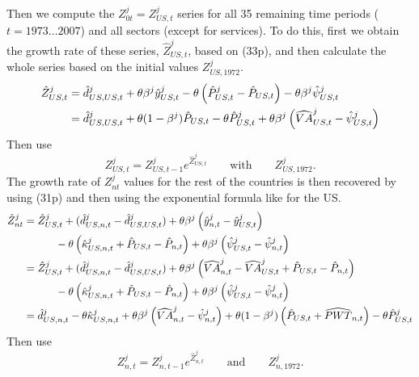 \documentclass[11pt,oneside,a4paper]{article}
\begin{document}
%
Then we compute the $Z_{0t}^j = Z_{US, t}^j$ series for all 35 remaining time periods ($t = 1973 \dots 2007$) and all sectors (except for services). To do this, first we obtain the growth rate of these series, $\hat{Z}_{US, t}^j$, based on (33p), and then calculate the whole series based on the initial values $Z_{US, 1972}^j$.
%
\begin{align}
\hat{Z}_{US, t}^{j} &= \hat{d}_{US, US, t}^{j} + \theta\beta^{j} \hat{y}_{US, t}^{j} - \theta \left(\hat{P}_{US, t}^{j} - \hat{P}_{US, t}\right) - \theta\beta^{j} \hat{\psi}_{US, t}^{j} \notag\\
%
&= \hat{d}_{US, US, t}^{j} + \theta(1 - \beta^{j}) \hat{P}_{US, t} - \theta \hat{P}_{US, t}^{j} + \theta\beta^{j} \left(\widehat{VA}^j_{US, t} - \hat{\psi}^j_{US, t}\right)
\end{align}
%
Then use
\begin{equation}
Z_{US, t}^j = Z_{US, t-1}^j e^{\hat{Z}_{US, t}^j} \qquad \mbox{with} \qquad Z_{US, 1972}^j. 
\end{equation}
%
The growth rate of $Z_{nt}^j$ values for the rest of the countries is then recovered by using (31p) and then using the exponential formula like for the US. 
%
\begin{align}
\hat{Z}_{nt}^{j} &= \hat{Z}_{US, t}^{j} + (\hat{d}_{US, n, t}^{j} - \hat{d}_{US, US, t}^{j}) + \theta \beta^{j} \left(\hat{y}_{n, t}^{j}-\hat{y}_{US, t}^{j}\right) \notag \\ 
& \qquad \quad - \theta \left(\hat{\kappa}_{US,n,t}^{j} + \hat{P}_{US,t} - \hat{P}_{n,t}\right) + \theta \beta^{j} \left(\hat{\psi}_{US,t}^{j} - \hat{\psi}_{n,t}^{j}\right) \notag \\ 
%
&= \hat{Z}_{US, t}^{j} + (\hat{d}_{US, n, t}^{j} - \hat{d}_{US, US, t}^{j}) + \theta \beta^{j} \left(\widehat{VA}_{n, t}^{j}-\widehat{VA}_{US, t}^{j} + \hat{P}_{US, t}-\hat{P}_{n, t}\right) \notag \\ 
& \qquad \quad - \theta \left(\hat{\kappa}_{US,n,t}^{j} + \hat{P}_{US,t} - \hat{P}_{n,t}\right) + \theta \beta^{j} \left(\hat{\psi}_{US,t}^{j} - \hat{\psi}_{n,t}^{j}\right) \notag \\ 
%
&= \hat{d}_{US, n, t}^{j} - \theta\hat{\kappa}_{US,n,t}^{j} + \theta \beta^{j} \left(\widehat{VA}^j_{n, t} - \hat{\psi}^j_{n, t}\right) + \theta(1 - \beta^{j}) \left(\hat{P}_{US, t} + \widehat{PWT}_{n,t}\right) - \theta \hat{P}_{US, t}^{j}
\end{align}
%
Then use
\begin{equation}
Z_{n, t}^j = Z_{n, t-1}^j e^{\hat{Z}_{n, t}^j} \qquad \mbox{and} \qquad Z_{n, 1972}^j.
\end{equation}
\end{document}
